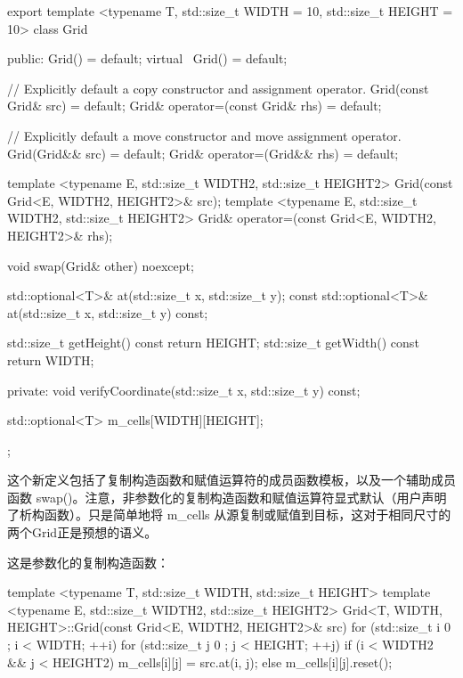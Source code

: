 \begin{cpp}
export template <typename T, std::size_t WIDTH = 10, std::size_t HEIGHT = 10>
class Grid
{
    public:
        Grid() = default;
        virtual ~Grid() = default;

        // Explicitly default a copy constructor and assignment operator.
        Grid(const Grid& src) = default;
        Grid& operator=(const Grid& rhs) = default;

        // Explicitly default a move constructor and move assignment operator.
        Grid(Grid&& src) = default;
        Grid& operator=(Grid&& rhs) = default;

        template <typename E, std::size_t WIDTH2, std::size_t HEIGHT2>
        Grid(const Grid<E, WIDTH2, HEIGHT2>& src);
        template <typename E, std::size_t WIDTH2, std::size_t HEIGHT2>
        Grid& operator=(const Grid<E, WIDTH2, HEIGHT2>& rhs);

        void swap(Grid& other) noexcept;

        std::optional<T>& at(std::size_t x, std::size_t y);
        const std::optional<T>& at(std::size_t x, std::size_t y) const;

        std::size_t getHeight() const { return HEIGHT; }
        std::size_t getWidth() const { return WIDTH; }

    private:
        void verifyCoordinate(std::size_t x, std::size_t y) const;

        std::optional<T> m_cells[WIDTH][HEIGHT];
};
\end{cpp}

这个新定义包括了复制构造函数和赋值运算符的成员函数模板，以及一个辅助成员函数 swap()。注意，非参数化的复制构造函数和赋值运算符显式默认（用户声明了析构函数）。只是简单地将 m\_cells 从源复制或赋值到目标，这对于相同尺寸的两个Grid正是预想的语义。

这是参数化的复制构造函数：

\begin{cpp}
template <typename T, std::size_t WIDTH, std::size_t HEIGHT>
template <typename E, std::size_t WIDTH2, std::size_t HEIGHT2>
Grid<T, WIDTH, HEIGHT>::Grid(const Grid<E, WIDTH2, HEIGHT2>& src)
{
    for (std::size_t i { 0 }; i < WIDTH; ++i) {
        for (std::size_t j { 0 }; j < HEIGHT; ++j) {
            if (i < WIDTH2 && j < HEIGHT2) {
                m_cells[i][j] = src.at(i, j);
            } else {
                m_cells[i][j].reset();
            }
        }
    }
}
\end{cpp}

